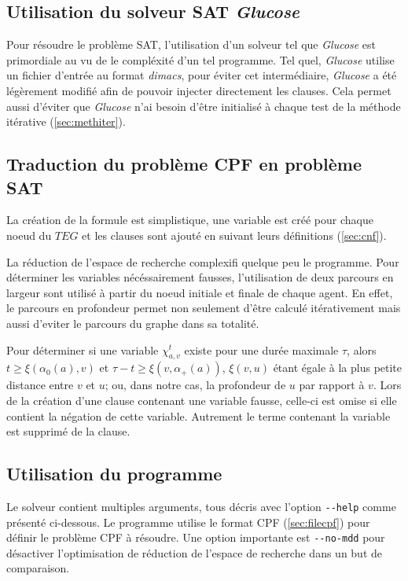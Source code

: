 \documentclass[french, 10pt, letterpaper]{article}
\theoremstyle{definition}
\theoremstyle{proposition}
\theoremstyle{example}
\begin{document}
    \subsection{Utilisation du solveur SAT \emph{Glucose}}
    \label{sec:satsolver}

    Pour résoudre le problème SAT, l'utilisation d'un solveur tel que \emph{Glucose} est primordiale au vu de le compléxité d'un tel programme.
    Tel quel, \emph{Glucose} utilise un fichier d'entrée au format \emph{dimacs}, pour éviter cet intermédiaire, \emph{Glucose} a été 
    légèrement modifié afin de pouvoir injecter directement les clauses.
    Cela permet aussi d'éviter que \emph{Glucose} n'ai besoin d'être initialisé à chaque test de la méthode itérative (\ref{sec:methiter}).

    \subsection{Traduction du problème CPF en problème SAT}

    La création de la formule est simplistique, une variable est créé pour chaque noeud du $TEG$ et les clauses sont ajouté en
    suivant leurs définitions (\ref{sec:cnf}).

    La réduction de l'espace de recherche complexifi quelque peu le programme. 
    Pour déterminer les variables nécéssairement fausses, l'utilisation de deux parcours en largeur sont utilisé à partir
    du noeud initiale et finale de chaque agent.
    En effet, le parcours en profondeur permet non seulement d'être calculé itérativement mais aussi d'eviter le parcours du graphe dans sa totalité.

    Pour déterminer si une variable $\chi^t_{a, v}$ existe pour une durée maximale $\tau$, alors $t \ge \xi(\alpha_0(a), v)$ et
    $\tau - t \ge \xi(v, \alpha_+(a))$, $\xi(v, u)$ étant égale à la plus petite distance entre $v$ et $u$; ou, dans notre cas,
    la profondeur de $u$  par rapport à $v$. 
    Lors de la création d'une clause contenant une variable fausse, celle-ci est omise si elle contient la négation de cette variable.
    Autrement le terme contenant la variable est supprimé de la clause.


    \subsection{Utilisation du programme}

    Le solveur contient multiples arguments, tous décris avec l'option \lstinline{--help} comme présenté ci-dessous.
    Le programme utilise le format CPF (\ref{sec:filecpf}) pour définir le problème CPF à résoudre. 
    Une option importante est \lstinline{--no-mdd} pour désactiver l'optimisation de réduction de l'espace de recherche dans un but de 
    comparaison. 
    
\end{document}
